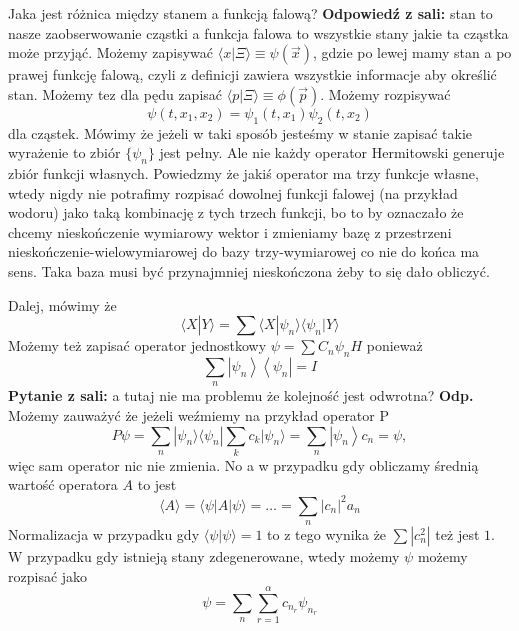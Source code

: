Jaka jest różnica między stanem a funkcją falową? \textbf{Odpowiedź z sali:} stan to nasze zaobserwowanie cząstki a funkcja falowa to wszystkie stany jakie ta cząstka może przyjąć. Możemy zapisywać $\langle x | \Xi \rangle \equiv \psi (\overrightarrow{x})$, gdzie po lewej mamy stan a po prawej funkcję falową, czyli z definicji zawiera wszystkie informacje aby określić stan. Możemy tez dla pędu zapisać $\langle p | \Xi \rangle \equiv \phi (\overrightarrow{p})$. Możemy rozpisywać $$ \psi(t, x_1, x_2) = \psi_1(t, x_1) \psi_2(t, x_2) $$ dla cząstek.
Mówimy że jeżeli w taki sposób jesteśmy w stanie zapisać takie wyrażenie to zbiór $\{\psi_n\}$ jest pełny. Ale nie każdy operator Hermitowski generuje zbiór funkcji własnych. Powiedzmy że jakiś operator ma trzy funkcje własne, wtedy nigdy nie potrafimy rozpisać dowolnej funkcji falowej (na przykład wodoru) jako taką kombinację z tych trzech funkcji, bo to by oznaczało że chcemy nieskończenie wymiarowy wektor i zmieniamy bazę z przestrzeni nieskończenie-wielowymiarowej do bazy trzy-wymiarowej co nie do końca ma sens. Taka baza musi być przynajmniej nieskończona żeby to się dało obliczyć.

Dalej, mówimy że 
\begin{equation*}
	\langle X | Y \rangle = \sum \langle X | \psi_n \rangle \langle \psi_n | Y \rangle
\end{equation*}
Możemy też zapisać operator jednostkowy $ \psi=\sum C_{n} \psi_{n} H $ ponieważ
\begin{equation*}
	\sum_{n}\left|\psi_{n}\right\rangle\left\langle\psi_{n}\right|=I 
\end{equation*}
\textbf{Pytanie z sali:} a tutaj nie ma problemu że kolejność jest odwrotna? \textbf{Odp.} Możemy zauważyć że jeżeli weźmiemy na przykład operator P
\begin{equation*}
	P \psi=\sum_{n} |\psi_{n} \rangle \langle \psi_{n} | \sum_{k} c_{k} |\psi_{n} \rangle  =\sum_{n}\left|\psi_{n}\right\rangle c_{n}=\psi,
\end{equation*}
więc sam operator nic nie zmienia.
No a w przypadku gdy obliczamy średnią wartość operatora $A$ to jest 
\begin{equation*}
	\langle A\rangle=\langle\psi| A|\psi\rangle= \dotsc = \sum_{n}\left|c_{n}\right|^{2} a_{n}
\end{equation*}
Normalizacja w przypadku gdy $\langle \psi | \psi \rangle = 1$ to z tego wynika że $\sum |c_n^2|$ też jest $1$.
W przypadku gdy istnieją stany zdegenerowane, wtedy możemy $\psi$ możemy rozpisać jako 
\begin{equation*}
	\psi = \sum_n \sum_{r=1}^{\alpha} c_{n_r} \psi_{n_r}
\end{equation*}

